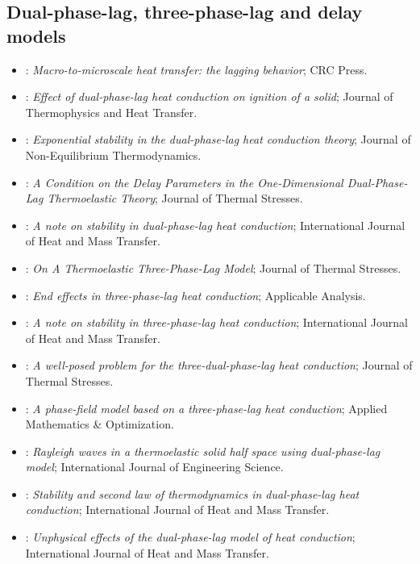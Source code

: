 \subsection{Dual-phase-lag, three-phase-lag and delay models}
\begin{itemize}\itemsep0pt\small
\item \citet{Tzou1997}: \emph{Macro-to-microscale heat transfer: the lagging behavior}; CRC Press.
\item \citet{Antaki2000}: \emph{Effect of dual-phase-lag heat conduction on ignition of a solid}; Journal of Thermophysics and Heat Transfer.
\item \citet{Quintanilla2002b}: \emph{Exponential stability in the dual-phase-lag heat conduction theory}; Journal of Non-Equilibrium Thermodynamics.
\item \citet{Quintanilla2003DPL}: \emph{A Condition on the Delay Parameters in the One-Dimensional Dual-Phase-Lag Thermoelastic Theory}; Journal of Thermal Stresses.
\item \citet{Quintanilla2006}: \emph{A note on stability in dual-phase-lag heat conduction}; International Journal of Heat and Mass Transfer.
\item \citet{RoyChoudhuri2007}: \emph{On A Thermoelastic Three-Phase-Lag Model}; Journal of Thermal Stresses.
\item \citet{Quintanilla2008}: \emph{End effects in three-phase-lag heat conduction}; Applicable Analysis.
\item \citet{Quintanilla2008a}: \emph{A note on stability in three-phase-lag heat conduction}; International Journal of Heat and Mass Transfer.
\item \citet{Quintanilla2009}: \emph{A well-posed problem for the three-dual-phase-lag heat conduction}; Journal of Thermal Stresses.
\item \citet{Miranville2010}: \emph{A phase-field model based on a three-phase-lag heat conduction}; Applied Mathematics \& Optimization.
\item \citet{Abouelregal2011}: \emph{Rayleigh waves in a thermoelastic solid half space using dual-phase-lag model}; International Journal of Engineering Science.
\item \citet{Fabrizio2014}: \emph{Stability and second law of thermodynamics in dual-phase-lag heat conduction}; International Journal of Heat and Mass Transfer.
\item \citet{Rukolaine2014}: \emph{Unphysical effects of the dual-phase-lag model of heat conduction}; International Journal of Heat and Mass Transfer.

\end{itemize}
